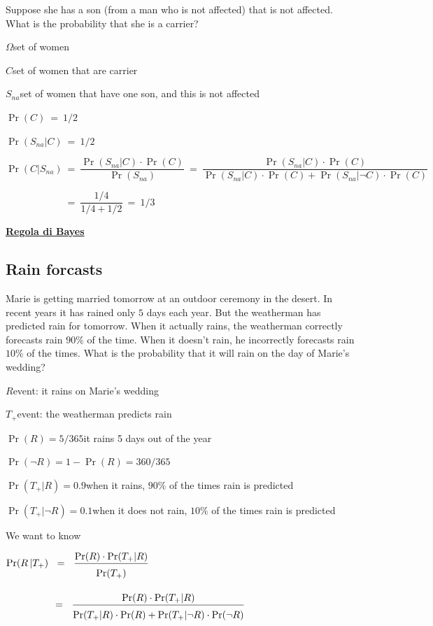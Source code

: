 \documentclass[11pt,openany]{book}
\begin{document}
Suppose she has a son (from a man who is not affected) that is not affected. What is the probability that she is a carrier?

$\Omega$\hfill  set of women 

$C$\hfill set of women that are carrier

$S_{na}$\hfill set of women that have one son, and this is not affected

$\Pr(C)\ =\ 1/2$\hfill 

$\Pr(S_{na}|C)\ =\ 1/2$\hfill 

$\Pr(C|S_{na})\ =\ \dfrac{\Pr(S_{na}|C)\cdot \Pr(C)}{\Pr(S_{na})}\ =\ \dfrac{\Pr(S_{na}|C)\cdot \Pr(C)}{\Pr(S_{na}|C)\cdot \Pr(C)+\Pr(S_{na}|\neg C)\cdot \Pr(C)}$

$\phantom{\Pr(C|S_{na})}\ =\ \dfrac{1/4}{1/4+1/2}\ =\ 1/3$


\clearpage\hfill
\textbf{{\color{brown}\hyperref[RegolaBayes]{Regola di Bayes} \faShare}}
\subsection{Rain forcasts}
\label{rain_desert}

Marie is getting married tomorrow at an outdoor ceremony in the desert. In recent years it has rained only $5$ days each year. But the weatherman has predicted rain for tomorrow. When it actually rains, the weatherman correctly forecasts rain $90\%$ of the time. When it doesn’t rain, he incorrectly forecasts rain $10\%$ of the times. What is the probability that it will rain on the day of Marie’s wedding?


$R$\hfill event: it rains on Marie’s wedding

$T_+$\hfill event: the weatherman predicts rain

$\Pr(R) = 5/365$\hfill it rains 5 days out of the year

$\Pr(\neg R) = 1-\Pr(R)= 360/365$

$\Pr(T_+|R) = 0.9$\hfill when it rains, $90\%$ of the times rain is predicted

$\Pr(T_+|\neg R) = 0.1$\hfill when it does not rain, $10\%$ of the times rain is predicted

\bigskip
We want to know

$\displaystyle \Pr(R\,| T_+)\medrel{=}\frac{\Pr(R)\cdot \Pr(T_+|R)}{\Pr(T_+)\vphantom{\Big[}}$

$\displaystyle\hphantom{\Pr(R | T_+)}\medrel{=}\frac{\Pr(R)\cdot \Pr(T_+|R)}{\Pr(T_+|R)\cdot \Pr(R)+ \Pr(T_+|\neg R)\cdot \Pr(\neg R)\vphantom{\Big[}}$
\end{document}
